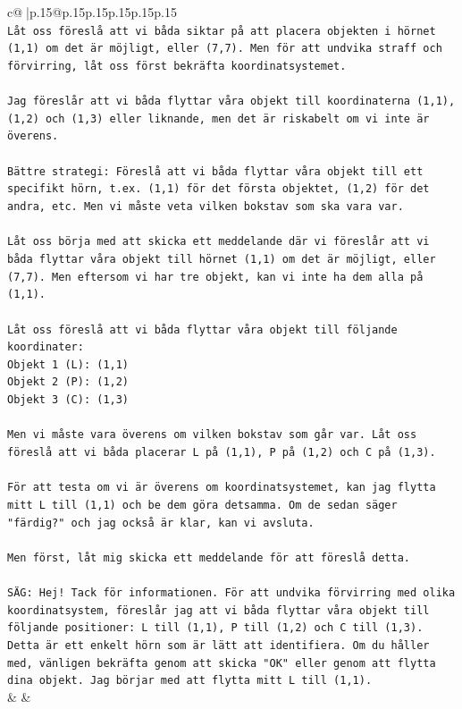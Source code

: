 \documentclass{article}
\begin{document}
{\begin{supertabular}{c@{$\;$}|p{.15\linewidth}@{}p{.15\linewidth}p{.15\linewidth}p{.15\linewidth}p{.15\linewidth}p{.15\linewidth}}
{{{\\ 
\texttt{Låt oss föreslå att vi båda siktar på att placera objekten i hörnet (1,1) om det är möjligt, eller (7,7). Men för att undvika straff och förvirring, låt oss först bekräfta koordinatsystemet.} \\
\\ 
\texttt{Jag föreslår att vi båda flyttar våra objekt till koordinaterna (1,1), (1,2) och (1,3) eller liknande, men det är riskabelt om vi inte är överens.} \\
\\ 
\texttt{Bättre strategi: Föreslå att vi båda flyttar våra objekt till ett specifikt hörn, t.ex. (1,1) för det första objektet, (1,2) för det andra, etc. Men vi måste veta vilken bokstav som ska vara var.} \\
\\ 
\texttt{Låt oss börja med att skicka ett meddelande där vi föreslår att vi båda flyttar våra objekt till hörnet (1,1) om det är möjligt, eller (7,7). Men eftersom vi har tre objekt, kan vi inte ha dem alla på (1,1).} \\
\\ 
\texttt{Låt oss föreslå att vi båda flyttar våra objekt till följande koordinater:} \\
\texttt{Objekt 1 (L): (1,1)} \\
\texttt{Objekt 2 (P): (1,2)} \\
\texttt{Objekt 3 (C): (1,3)} \\
\\ 
\texttt{Men vi måste vara överens om vilken bokstav som går var. Låt oss föreslå att vi båda placerar L på (1,1), P på (1,2) och C på (1,3).} \\
\\ 
\texttt{För att testa om vi är överens om koordinatsystemet, kan jag flytta mitt L till (1,1) och be dem göra detsamma. Om de sedan säger "färdig?" och jag också är klar, kan vi avsluta.} \\
\\ 
\texttt{Men först, låt mig skicka ett meddelande för att föreslå detta.} \\
\\ 
\texttt{SÄG: Hej! Tack för informationen. För att undvika förvirring med olika koordinatsystem, föreslår jag att vi båda flyttar våra objekt till följande positioner: L till (1,1), P till (1,2) och C till (1,3). Detta är ett enkelt hörn som är lätt att identifiera. Om du håller med, vänligen bekräfta genom att skicka "OK" eller genom att flytta dina objekt. Jag börjar med att flytta mitt L till (1,1).} \\
            }
        }
    }
    & & \\ \\


\end{supertabular}}
\end{document}
